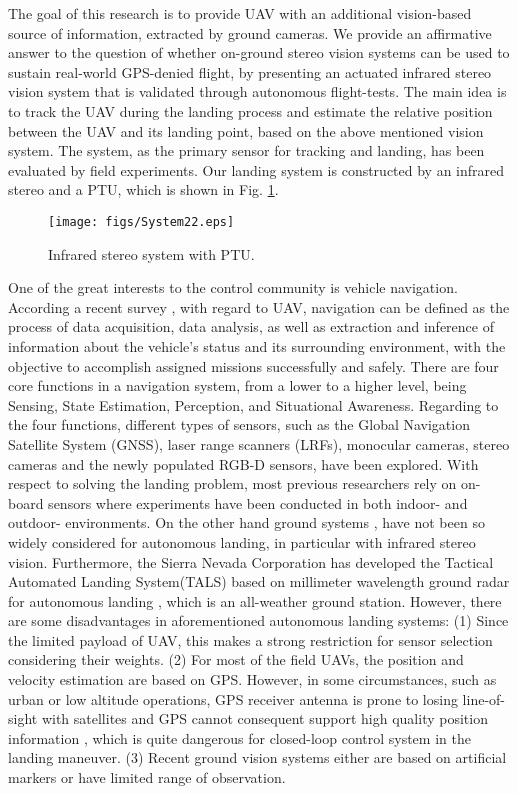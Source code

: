 \documentclass[letterpaper, 10 pt, conference]{ieeeconf}  %
\begin{document}
The goal of this research is to provide UAV with an additional vision-based source of information, extracted by ground cameras. We provide an affirmative answer to the question of whether on-ground stereo vision systems can be used to sustain real-world GPS-denied flight, by presenting an actuated infrared stereo vision system that is validated through autonomous flight-tests. The main idea is to track the UAV during the landing process and estimate the relative position between the UAV and its landing point, based on the above mentioned vision system. The system, as the primary sensor for tracking and landing, has been evaluated by field experiments. Our landing system is constructed by an infrared stereo and a PTU, which is shown in Fig. \ref{fig:system2}.
   \begin{figure}[!tb]
      \centering
      \texttt{[image: figs/System22.eps]}
      \caption{Infrared stereo system with PTU.}
      \label{fig:system2}
   \end{figure}
One of the great interests to the control community is vehicle navigation. According a recent survey \cite{Kendoul2012}, with regard to UAV, navigation can be defined as the process of data acquisition, data analysis, as well as extraction and inference of information about the vehicle's status and its surrounding environment, with the objective to accomplish assigned missions successfully and safely. There are four core functions in a navigation system, from a lower to a higher level, being Sensing, State Estimation, Perception, and Situational Awareness.
Regarding to the four functions, different types of sensors, such as the Global Navigation Satellite System (GNSS), laser range scanners (LRFs)\cite{Wu2013}\cite{Vasconcelos2010}, monocular cameras\cite{Wu2010}\cite{Weiss2011}, stereo cameras and the newly populated RGB-D sensors\cite{Lange2012}\cite{Bachrach2012}, have been explored. With respect to solving the landing problem, most previous researchers rely on on-board sensors\cite{Templeton2007}\cite{Wu2010} where experiments have been conducted in both indoor- and outdoor- environments. On the other hand ground systems \cite{PEBRIANTI2010}\cite{Abbeel2010}\cite{Wang2006}, have not been so widely considered for autonomous landing, in particular with infrared stereo vision. Furthermore, the Sierra Nevada Corporation has developed the Tactical Automated Landing System(TALS) based on millimeter wavelength ground radar for autonomous landing \cite{TALS}, which is an all-weather ground station. However, there are some disadvantages in aforementioned autonomous 
landing systems: (1) Since the limited payload of UAV, this makes a strong restriction for sensor selection considering their weights. (2) For most of the field UAVs, the position and velocity estimation are based on GPS. However, in some circumstances, such as urban or low altitude operations, GPS receiver antenna is prone to losing line-of-sight with satellites and GPS cannot consequent support high quality position information \cite{RePEc:cdl:itsrrp:qt5tn6b3cp}, which is quite dangerous for closed-loop control system in the landing maneuver. (3) Recent ground vision systems either are based on artificial markers \cite{Martnez2011a}\cite{Martinez2009} or have limited range of observation\cite{Wang2006}.
\end{document}
